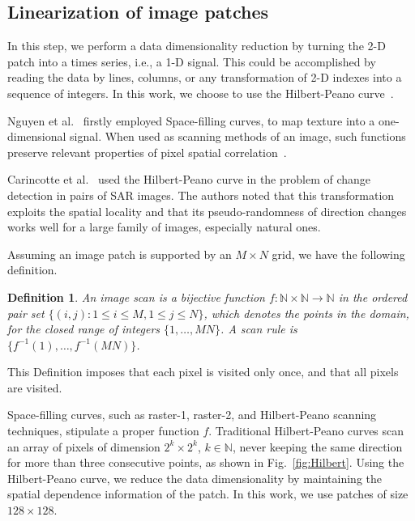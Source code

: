 \documentclass[journal]{IEEEtran}
\begin{document}
	\subsection{Linearization of image patches}\label{linearization}
	
	In this step, we perform a data dimensionality reduction by turning the 2-D patch into a times series, i.e., a 1-D signal.
	This could be accomplished by reading the data by lines, columns, or any transformation of 2-D indexes into a sequence of integers.
	In this work, we choose to use the Hilbert-Peano curve~\cite{Lee1994Texture}.
	
	Nguyen et al.~\cite{nguyen1982space} firstly employed Space-filling curves, to map texture into a one-dimensional signal.
	When used as scanning methods of an image, such functions preserve relevant properties of pixel spatial correlation~\cite{Lee1994Texture}.
	
	Carincotte et al.~\cite{Carincotte2006changeDetection} used the Hilbert-Peano curve in the problem of change detection in pairs of SAR images.
	The authors noted that this transformation exploits the spatial locality and that its pseudo-randomness
	of direction changes works well for a large family of images, especially
	natural ones.
	
	Assuming an image patch is supported by an $M \times N$ grid, we have the following definition.
	
	\newtheorem{mydef}{Definition}
	\begin{mydef}
		An image scan is a bijective function $f \colon \mathbb{N} \times \mathbb{N} \to \mathbb{N}$ in the ordered pair set $ \{(i, j): 1 \leq i \leq M , 1 \leq j \leq N\}$, which denotes the points in the domain, for the closed range of integers $\{1, \dots, M  N\}$.
		A scan rule is $\{f^{-1}(1), \dots, f^{-1}(M  N)\}$.
		\label{def:CurveFilling}
	\end{mydef}
	This Definition imposes that each pixel is visited only once, and that all pixels are visited.
	
	Space-filling curves, such as raster-1, raster-2, and Hilbert-Peano scanning techniques, stipulate a proper function $f$.
	Traditional Hilbert-Peano curves scan an array of pixels of dimension $2^k \times 2^k$, $k \in \mathbb{N}$, never keeping the same direction for more than three consecutive points, as shown in Fig.~\ref{fig:Hilbert}.
	Using the Hilbert-Peano curve, we reduce the data dimensionality by maintaining the spatial dependence information of the patch.
	In this work, we use patches of size $128 \times 128$.
	
\end{document}
